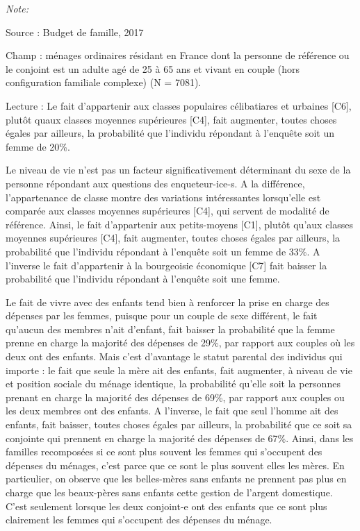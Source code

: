 \documentclass[
  12pt,
]{book}
\begin{document}
\begin{table}[!h]
{\begin{threeparttable}
\begin{tabular}[t]{lccc}
\end{tabular}
\begin{tablenotes}
\item \textit{Note: } 
\item Source : Budget de famille, 2017
\item Champ : ménages ordinaires résidant en France dont la personne de référence ou le conjoint est un adulte agé de 25 à 65 ans et vivant en couple (hors configuration familiale complexe) (N = 7081).
\item Lecture : Le fait d'appartenir aux classes populaires célibatiares et urbaines [C6], plutôt quaux classes moyennes supérieures [C4], fait augmenter, toutes choses égales par ailleurs, la probabilité que l'individu répondant à l’enquête soit un femme de 20\%.
\end{tablenotes}
\end{threeparttable}}
\end{table}

Le niveau de vie n'est pas un facteur significativement déterminant du
sexe de la personne répondant aux questions des enqueteur-ice-s. A la
différence, l'appartenance de classe montre des variations intéressantes
lorsqu'elle est comparée aux classes moyennes supérieures {[}C4{]}, qui
servent de modalité de référence. Ainsi, le fait d'appartenir aux
petits-moyens {[}C1{]}, plutôt qu'aux classes moyennes supérieures
{[}C4{]}, fait augmenter, toutes choses égales par ailleurs, la
probabilité que l'individu répondant à l'enquête soit un femme de 33\%.
A l'inverse le fait d'appartenir à la bourgeoisie économique {[}C7{]}
fait baisser la probabilité que l'individu répondant à l'enquête soit
une femme.

Le fait de vivre avec des enfants tend bien à renforcer la prise en
charge des dépenses par les femmes, puisque pour un couple de sexe
différent, le fait qu'aucun des membres n'ait d'enfant, fait baisser la
probabilité que la femme prenne en charge la majorité des dépenses de
29\%, par rapport aux couples où les deux ont des enfants. Mais c'est
d'avantage le statut parental des individus qui importe : le fait que
seule la mère ait des enfants, fait augmenter, à niveau de vie et
position sociale du ménage identique, la probabilité qu'elle soit la
personnes prenant en charge la majorité des dépenses de 69\%, par
rapport aux couples ou les deux membres ont des enfants. A l'inverse, le
fait que seul l'homme ait des enfants, fait baisser, toutes choses
égales par ailleurs, la probabilité que ce soit sa conjointe qui
prennent en charge la majorité des dépenses de 67\%. Ainsi, dans les
familles recomposées si ce sont plus souvent les femmes qui s'occupent
des dépenses du ménages, c'est parce que ce sont le plus souvent elles
les mères. En particulier, on observe que les belles-mères sans enfants
ne prennent pas plus en charge que les beaux-pères sans enfants cette
gestion de l'argent domestique. C'est seulement lorsque les deux
conjoint-e ont des enfants que ce sont plus clairement les femmes qui
s'occupent des dépenses du ménage.
\end{document}
